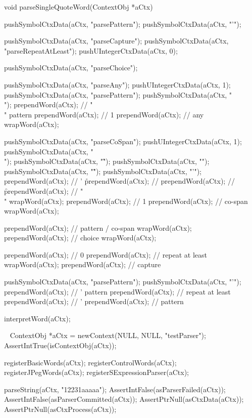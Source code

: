 \startCCode
void parseSingleQuoteWord(ContextObj *aCtx) {

  pushSymbolCtxData(aCtx, "parsePattern");
  pushSymbolCtxData(aCtx, "'");

  pushSymbolCtxData(aCtx, "parseCapture");
  pushSymbolCtxData(aCtx, "parseRepeatAtLeast");
  pushUIntegerCtxData(aCtx, 0);

  pushSymbolCtxData(aCtx, "parseChoice");

  pushSymbolCtxData(aCtx, "parseAny");
  pushUIntegerCtxData(aCtx, 1);
  pushSymbolCtxData(aCtx, "parsePattern");
  pushSymbolCtxData(aCtx, "\\");
  prependWord(aCtx);  // "\\" pattern
  prependWord(aCtx);  // 1
  prependWord(aCtx);  // any
  wrapWord(aCtx);

  pushSymbolCtxData(aCtx, "parseCoSpan");
  pushUIntegerCtxData(aCtx, 1);
  pushSymbolCtxData(aCtx, "\\");
  pushSymbolCtxData(aCtx, "\f");
  pushSymbolCtxData(aCtx, "\n");
  pushSymbolCtxData(aCtx, "\r");
  pushSymbolCtxData(aCtx, "'");
  prependWord(aCtx);  // ' \r
  prependWord(aCtx);  // \n
  prependWord(aCtx);  // \f
  prependWord(aCtx);  // "\\"
  wrapWord(aCtx);
  prependWord(aCtx);  // 1
  prependWord(aCtx);  // co-span
  wrapWord(aCtx);
  
  prependWord(aCtx);  // pattern / co-span
  wrapWord(aCtx);
  prependWord(aCtx);  // choice
  wrapWord(aCtx);
  
  prependWord(aCtx);  // 0
  prependWord(aCtx);  // repeat at least
  wrapWord(aCtx);
  prependWord(aCtx);  // capture
  
  pushSymbolCtxData(aCtx, "parsePattern");
  pushSymbolCtxData(aCtx, "'");
  prependWord(aCtx);  // ' pattern
  prependWord(aCtx);  // repeat at least
  prependWord(aCtx);  // '
  prependWord(aCtx);  // pattern

  interpretWord(aCtx);
}
\stopCCode

\CTestsSuiteSetup\
\startCTest
  ContextObj *aCtx = newContext(NULL, NULL, "testParser");
  AssertIntTrue(isContextObj(aCtx));
  
  registerBasicWords(aCtx);
  registerControlWords(aCtx);
  registerJPegWords(aCtx);
  registerSExpressionParser(aCtx);
\stopCTest

\startCTest
  parseString(aCtx, "12231aaaaa");
  AssertIntFalse(asParserFailed(aCtx));
  AssertIntFalse(asParserCommitted(aCtx));
  AssertPtrNull(asCtxData(aCtx));
  AssertPtrNull(asCtxProcess(aCtx));

